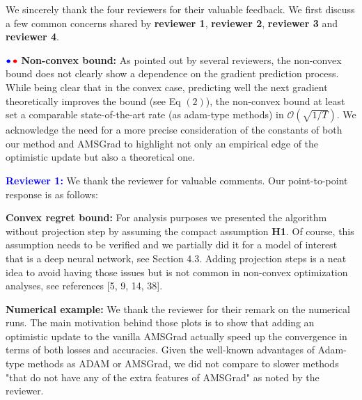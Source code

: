 \documentclass{article}
\begin{document}
We sincerely thank the four reviewers for their valuable feedback. 
We first discuss a few common concerns shared by \textbf{\color{blue}reviewer 1}, \textbf{\color{red} reviewer 2}, \textbf{\color{green!50!black}reviewer 3} and \textbf{\color{yellow!50!black}reviewer 4}. \vspace{-5pt}



${\color{blue}\bullet}\!~{\color{red}\bullet}$ \textbf{Non-convex bound:} 
As pointed out by several reviewers, the non-convex bound does not clearly show a dependence on the gradient prediction process.
While being clear that in the convex case, predicting well the next gradient theoretically improves the bound (see Eq $(2)$), the non-convex bound at least set a comparable state-of-the-art rate (as adam-type methods) in $\mathcal{O}( \sqrt{1/T} )$.
We acknowledge the need for a more precise consideration of the constants of both our method and AMSGrad to highlight not only an empirical edge of the optimistic update but also a theoretical one. 


\textbf{\textcolor{blue}{Reviewer 1:}} We thank the reviewer for valuable comments. Our point-to-point response is as follows:\vspace{-5pt}


\textbf{Convex regret bound:} 
For analysis purposes we presented the algorithm without projection step by assuming the compact assumption \textbf{H1}.
Of course, this assumption needs to be verified and we partially did it for a model of interest that is a deep neural network, see Section 4.3.
Adding projection steps is a neat idea to avoid having those issues but is not common in non-convex optimization analyses, see references [5, 9, 14, 38].\vspace{-5pt}

\textbf{Numerical example:} We thank the reviewer for their remark on the numerical runs. 
The main motivation behind those plots is to show that adding an optimistic update to the vanilla AMSGrad actually speed up the convergence in terms of both losses and accuracies.
Given the well-known advantages of Adam-type methods as ADAM or AMSGrad, we did not compare to slower methods "that do not have any of the extra features of AMSGrad" as noted by the reviewer.
\end{document}
